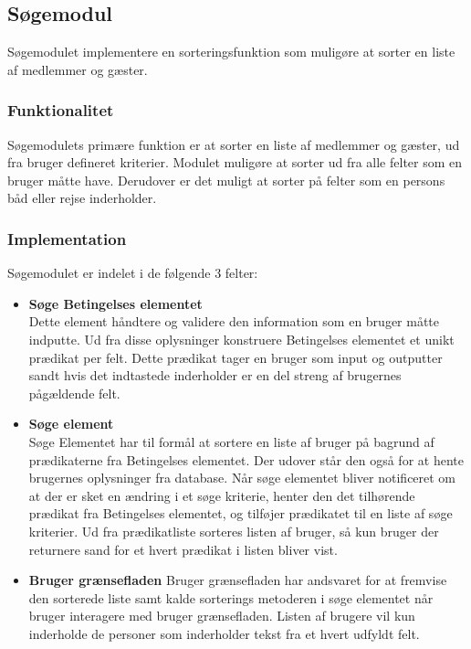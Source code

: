\subsection{Søgemodul}
\label{sub:s_searchmodul}

Søgemodulet implementere en sorteringsfunktion som muligøre at sorter en liste af medlemmer og gæster. 
\subsubsection{Funktionalitet}
\label{sub:funktionalitet}

Søgemodulets primære funktion er at sorter en liste af medlemmer og gæster, ud fra bruger defineret kriterier. Modulet muligøre at sorter ud fra alle felter som en bruger måtte have. Derudover er det muligt at sorter på felter som en persons båd eller rejse inderholder. 

\subsubsection{Implementation}
\label{sub:implementation}

Søgemodulet er indelet i de følgende 3 felter:

\begin{itemize}
	\item \textbf{Søge Betingelses elementet} \\
		Dette element håndtere og validere den information som en bruger måtte indputte. Ud fra disse oplysninger konstruere Betingelses elementet et unikt prædikat per felt. Dette prædikat tager en bruger som input og outputter sandt hvis det indtastede inderholder er en del streng af brugernes pågældende felt.

	\item \textbf{Søge element} \\
		Søge Elementet har til formål at sortere en liste af bruger på bagrund af prædikaterne fra Betingelses elementet. Der udover står den også for at hente brugernes oplysninger fra database. 
		Når søge elementet bliver notificeret om at der er sket en ændring i et søge kriterie, henter den det tilhørende prædikat fra Betingelses elementet, og tilføjer prædikatet til en liste af søge kriterier. Ud fra prædikatliste sorteres listen af bruger, så kun bruger der returnere sand for et hvert prædikat i listen bliver vist. 

	\item \textbf{Bruger grænsefladen}
		Bruger grænsefladen har andsvaret for at fremvise den sorterede liste samt kalde sorterings metoderen i søge elementet når bruger interagere med bruger grænsefladen. Listen af brugere vil kun inderholde de personer som inderholder tekst fra et hvert udfyldt felt.
\end{itemize}




